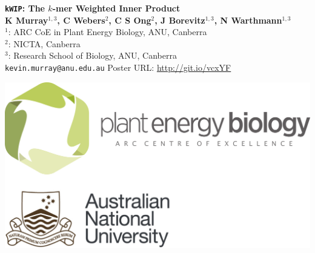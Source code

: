 \documentclass[a0,portrait]{a0poster}
\begin{document}
\begin{minipage}[b]{0.6\linewidth}
\Huge \textbf{\texttt{kWIP}: The $k$-mer Weighted Inner Product}\\[0.9cm]
\Large \textbf{K Murray$^{1,3}$, C Webers$^2$, C S Ong$^2$, J Borevitz$^{1,3}$, N Warthmann$^{1,3}$}\\[0.5cm]
\large $^1$: ARC CoE in Plant Energy Biology, ANU, Canberra\\[0.2cm]
\large $^2$: NICTA, Canberra\\[0.4cm]
\large $^3$: Research School of Biology, ANU, Canberra\\[0.4cm]
\large \texttt{kevin.murray@anu.edu.au} \hspace{1cm} Poster URL: \large
  \url{http://git.io/vcxYF}\\
\end{minipage}
\begin{minipage}[b]{0.4\linewidth}
  \hspace{5cm}
\includegraphics[width=20cm]{logo.png}\\
\end{minipage}

\vspace{1cm} %
\end{document}
